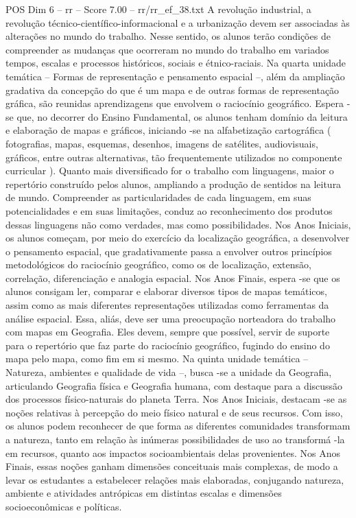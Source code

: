 \begin{textsample}{POS Dim 6 – rr – Score 7.00 – rr/rr\_ef\_38.txt}
A revolução industrial, a revolução técnico-científico-informacional e a urbanização devem ser associadas às alterações no mundo do trabalho.
Nesse sentido, os alunos terão condições de compreender as mudanças que ocorreram no mundo do trabalho em variados tempos, escalas e processos históricos, sociais e étnico-raciais.
Na quarta unidade temática – Formas de representação e pensamento espacial –, além da ampliação gradativa da concepção do que é um mapa e de outras formas de representação gráfica, são reunidas aprendizagens que envolvem o raciocínio geográfico.
Espera -se que, no decorrer do Ensino Fundamental, os alunos tenham domínio da leitura e elaboração de mapas e gráficos, iniciando -se na alfabetização cartográfica ( fotografias, mapas, esquemas, desenhos, imagens de satélites, audiovisuais, gráficos, entre outras alternativas, tão frequentemente utilizados no componente curricular ).
Quanto mais diversificado for o trabalho com linguagens, maior o repertório construído pelos alunos, ampliando a produção de sentidos na leitura de mundo.
Compreender as particularidades de cada linguagem, em suas potencialidades e em suas limitações, conduz ao reconhecimento dos produtos dessas linguagens não como verdades, mas como possibilidades.
Nos Anos Iniciais, os alunos começam, por meio do exercício da localização geográfica, a desenvolver o pensamento espacial, que gradativamente passa a envolver outros princípios metodológicos do raciocínio geográfico, como os de localização, extensão, correlação, diferenciação e analogia espacial.
Nos Anos Finais, espera -se que os alunos consigam ler, comparar e elaborar diversos tipos de mapas temáticos, assim como as mais diferentes representações utilizadas como ferramentas da análise espacial.
Essa, aliás, deve ser uma preocupação norteadora do trabalho com mapas em Geografia.
Eles devem, sempre que possível, servir de suporte para o repertório que faz parte do raciocínio geográfico, fugindo do ensino do mapa pelo mapa, como fim em si mesmo.
Na quinta unidade temática – Natureza, ambientes e qualidade de vida –, busca -se a unidade da Geografia, articulando Geografia física e Geografia humana, com destaque para a discussão dos processos físico-naturais do planeta Terra.
Nos Anos Iniciais, destacam -se as noções relativas à percepção do meio físico natural e de seus recursos.
Com isso, os alunos podem reconhecer de que forma as diferentes comunidades transformam a natureza, tanto em relação às inúmeras possibilidades de uso ao transformá -la em recursos, quanto aos impactos socioambientais delas provenientes.
Nos Anos Finais, essas noções ganham dimensões conceituais mais complexas, de modo a levar os estudantes a estabelecer relações mais elaboradas, conjugando natureza, ambiente e atividades antrópicas em distintas escalas e dimensões socioeconômicas e políticas.

\end{textsample}
